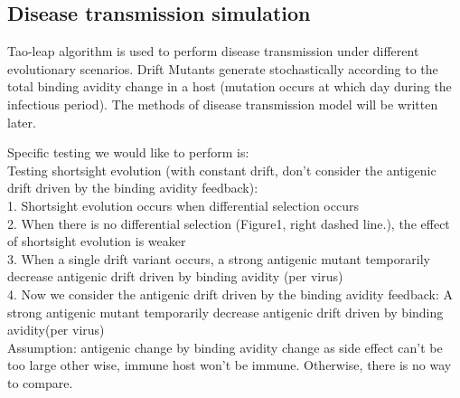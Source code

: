 \documentclass{article}
\begin{document}
 
\subsection{Disease transmission simulation}
Tao-leap algorithm is used to perform disease transmission under different evolutionary scenarios. Drift Mutants generate stochastically according to the total binding avidity change in a host (mutation occurs at which day during the infectious period). The methods of disease transmission model will be written later.


Specific testing we would like to perform is: \\
Testing shortsight evolution (with constant drift, don't consider the antigenic drift driven by the binding avidity feedback):\\
1. Shortsight evolution occurs when differential selection occurs \\
2. When there is no differential selection (Figure1, right dashed line.), the effect of shortsight evolution is weaker \\
3. When a single drift variant occurs, a strong antigenic mutant temporarily decrease antigenic drift driven by binding avidity (per virus)  \\
4. Now we consider the antigenic drift driven by the binding avidity feedback: A strong antigenic mutant temporarily decrease antigenic drift driven by binding avidity(per virus)  \\


Assumption: antigenic change by binding avidity change as side effect can't be too large other wise, immune host won't be immune. Otherwise, there is no way to compare. 

                
\end{document}
